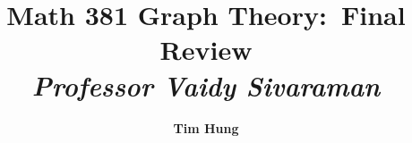 

\title{
    \vspace{2in}
    \textmd{\textbf{Math 381 Graph Theory:\ Final Review}}\\
    \vspace{0.1in}\large{\textit{Professor Vaidy Sivaraman}}\\
    \vspace{0.5in}
}

\author{\textbf{Tim Hung}}


{

\maketitle

\pagebreak

\tableofcontents
 
}{
}{
}{

}
